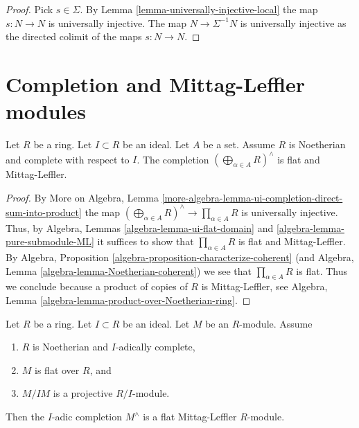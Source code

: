 \begin{proof}
Pick $s \in \Sigma$. By
Lemma \ref{lemma-universally-injective-local}
the map $s : N \to N$ is universally injective.
The map $N \to \Sigma^{-1}N$ is universally injective as the directed
colimit of the maps $s : N \to N$.
\end{proof}






\section{Completion and Mittag-Leffler modules}
\label{section-completion-ML}


\begin{lemma}
\label{lemma-completed-direct-sum-ML}
Let $R$ be a ring. Let $I \subset R$ be an ideal. Let $A$ be a set.
Assume $R$ is Noetherian and complete with respect to $I$. The completion
$(\bigoplus\nolimits_{\alpha \in A} R)^\wedge$
is flat and Mittag-Leffler.
\end{lemma}

\begin{proof}
By
More on Algebra, Lemma
\ref{more-algebra-lemma-ui-completion-direct-sum-into-product}
the map $(\bigoplus\nolimits_{\alpha \in A} R)^\wedge
\to \prod_{\alpha \in A} R$ is universally injective.
Thus, by
Algebra, Lemmas \ref{algebra-lemma-ui-flat-domain} and
\ref{algebra-lemma-pure-submodule-ML}
it suffices to show that $\prod_{\alpha \in A} R$ is flat and Mittag-Leffler.
By
Algebra, Proposition \ref{algebra-proposition-characterize-coherent}
(and
Algebra, Lemma \ref{algebra-lemma-Noetherian-coherent})
we see that $\prod_{\alpha \in A} R$ is flat.
Thus we conclude because a product of copies of $R$ is Mittag-Leffler, see
Algebra, Lemma \ref{algebra-lemma-product-over-Noetherian-ring}.
\end{proof}

\begin{lemma}
\label{lemma-lift-ML}
Let $R$ be a ring. Let $I \subset R$ be an ideal.
Let $M$ be an $R$-module.
Assume
\begin{enumerate}
\item $R$ is Noetherian and $I$-adically complete,
\item $M$ is flat over $R$, and
\item $M/IM$ is a projective $R/I$-module.
\end{enumerate}
Then the $I$-adic completion $M^\wedge$ is a flat Mittag-Leffler
$R$-module.
\end{lemma}

